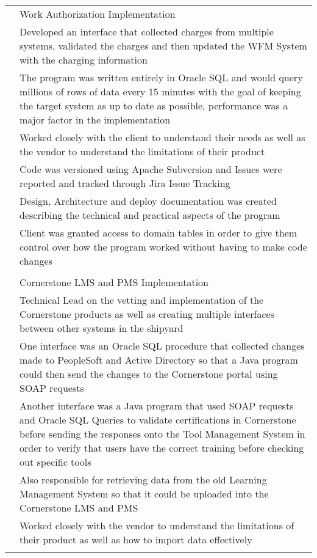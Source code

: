 \documentclass[12pt]{article}
\begin{document}
\begin{tabular}{p{2.7cm}|p{15.0cm}}
	\centering 2018 & Work Authorization Implementation\\&\small{Developed an interface that collected charges from multiple systems, validated the charges and then updated the WFM System with the charging information}\\&\small{The program was written entirely in Oracle SQL and would query millions of rows of data every 15 minutes with the goal of keeping the target system as up to date as possible, performance was a major factor in the implementation}\\&\small{Worked closely with the client to understand their needs as well as the vendor to understand the limitations of their product}\\&\small{Code was versioned using Apache Subversion and Issues were reported and tracked through Jira Issue Tracking}\\&\small{Design, Architecture and deploy documentation was created describing the technical and practical aspects of the program}\\&\small{Client was granted access to domain tables in order to give them control over how the program worked without having to make code changes}\\\multicolumn{2}{c}{} \\
	\centering 2017 & Cornerstone LMS and PMS Implementation\\&\small{Technical Lead on the vetting and implementation of the Cornerstone products as well as creating multiple interfaces between other systems in the shipyard}\\&\small{One interface was an Oracle SQL procedure that collected changes made to PeopleSoft and Active Directory so that a Java program could then send the changes to the Cornerstone portal using SOAP requests}\\&\small{Another interface was a Java program that used SOAP requests and Oracle SQL Queries to validate certifications in Cornerstone before sending the responses onto the Tool Management System in order to verify that users have the correct training before checking out specific tools}\\&\small{Also responsible for retrieving data from the old Learning Management System so that it could be uploaded into the Cornerstone LMS and PMS}\\&\small{Worked closely with the vendor to understand the limitations of their product as well as how to import data effectively}\\\multicolumn{2}{c}{} \\

\end{tabular}
\end{document}

